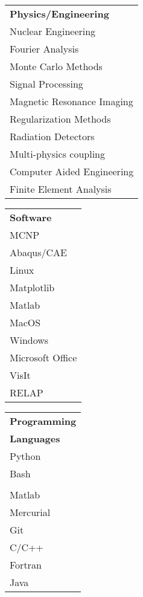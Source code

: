 \\[2mm]
\begin{minipage}{0.3\textwidth}
\begin{tabular}{l}
	{\large\textbf{Physics/Engineering}} \\
	\highskill Nuclear Engineering \\
	\highskill Fourier Analysis \\ 
	\medhighskill Monte Carlo Methods \\
	\medskill Signal Processing \\
	\medskill Magnetic Resonance Imaging \\ 
	\medskill Regularization Methods  \\
	\medskill Radiation Detectors \\
	\medlowskill Multi-physics coupling \\
	\medlowskill Computer Aided Engineering \\
	\medlowskill Finite Element Analysis \\
\end{tabular}
\end{minipage}%
\begin{minipage}{0.18\textwidth}
\begin{tabular}{l}
	{\large\textbf{Software}} \\
	\highskill \textsc{MCNP} \\
	\highskill Abaqus/CAE \\
	\highskill Linux \\ 
	\highskill Matplotlib \\ 
	\medhighskill Matlab \\
	\medhighskill MacOS \\
	\medskill Windows \\
	\medskill Microsoft Office \\
	\medlowskill VisIt \\
	\lowskill RELAP
\end{tabular}
\end{minipage}%
\begin{minipage}{0.18\textwidth}
\begin{tabular}{l}
	{\large\textbf{Programming}} \\
	{\large\textbf{Languages}} \\
	\highskill Python \\
	\highskill Bash \\ 
	\highskill {\fontfamily{ptm}\selectfont \LaTeX} \\ 
	\medhighskill Matlab \\
	\medhighskill Mercurial \\
	\medskill Git \\
	\medskill C/C++ \\
	\medskill Fortran \\
	\medlowskill Java \\
\end{tabular}
\end{minipage}%
